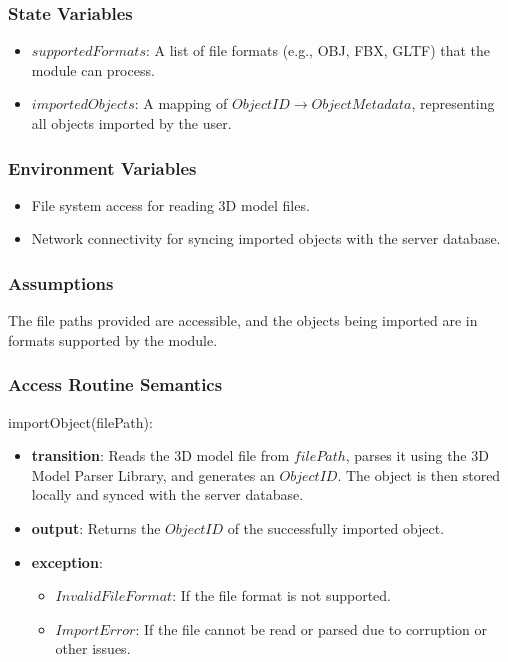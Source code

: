 \documentclass[12pt, titlepage]{article}
\begin{document}
\subsubsection{State Variables}

\begin{itemize}
  \item \( supportedFormats \): A list of file formats (e.g., OBJ, FBX, GLTF) that the module can process.
  \item \( importedObjects \): A mapping of \( ObjectID \to ObjectMetadata \), representing all objects imported by the user.
\end{itemize}

\subsubsection{Environment Variables}

\begin{itemize}
  \item File system access for reading 3D model files.
  \item Network connectivity for syncing imported objects with the server database.
\end{itemize}

\subsubsection{Assumptions}

The file paths provided are accessible, and the objects being imported are in formats supported by the module.

\subsubsection{Access Routine Semantics}

\noindent importObject(filePath):
\begin{itemize}
  \item \textbf{transition}:
        Reads the 3D model file from \( filePath \), parses it using the 3D Model Parser Library, and generates an \( ObjectID \). The object is then stored locally and synced with the server database.
  \item \textbf{output}:
        Returns the \( ObjectID \) of the successfully imported object.
  \item \textbf{exception}:
        \begin{itemize}
          \item \( InvalidFileFormat \): If the file format is not supported.
          \item \( ImportError \): If the file cannot be read or parsed due to corruption or other issues.
        \end{itemize}
\end{itemize}
\end{document}
